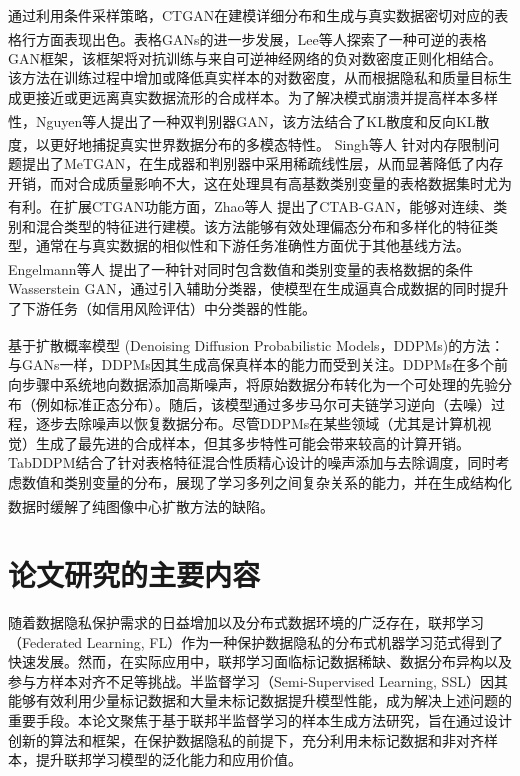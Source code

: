 通过利用条件采样策略，CTGAN在建模详细分布和生成与真实数据密切对应的表格行方面表现出色。表格GANs的进一步发展，Lee等人\textsuperscript{\cite{lee2021invertible}}探索了一种可逆的表格GAN框架，该框架将对抗训练与来自可逆神经网络的负对数密度正则化相结合。该方法在训练过程中增加或降低真实样本的对数密度，从而根据隐私和质量目标生成更接近或更远离真实数据流形的合成样本。为了解决模式崩溃并提高样本多样性，Nguyen等人\textsuperscript{\cite{nguyen2017dual}}提出了一种双判别器GAN，该方法结合了KL散度和反向KL散度，以更好地捕捉真实世界数据分布的多模态特性。 Singh等人\textsuperscript{\cite{singh2021metgan}} 针对内存限制问题提出了MeTGAN，在生成器和判别器中采用稀疏线性层，从而显著降低了内存开销，而对合成质量影响不大，这在处理具有高基数类别变量的表格数据集时尤为有利。在扩展CTGAN功能方面，Zhao等人\textsuperscript{\cite{zhao2021ctab}} 提出了CTAB-GAN，能够对连续、类别和混合类型的特征进行建模。该方法能够有效处理偏态分布和多样化的特征类型，通常在与真实数据的相似性和下游任务准确性方面优于其他基线方法。 Engelmann等人\textsuperscript{\cite{engelmann2021conditional}} 提出了一种针对同时包含数值和类别变量的表格数据的条件Wasserstein GAN，通过引入辅助分类器，使模型在生成逼真合成数据的同时提升了下游任务（如信用风险评估）中分类器的性能。

基于扩散概率模型 (Denoising Diffusion Probabilistic Models，DDPMs)\textsuperscript{\cite{ho2020denoising}}的方法：与GANs一样，DDPMs因其生成高保真样本的能力而受到关注。DDPMs在多个前向步骤中系统地向数据添加高斯噪声，将原始数据分布转化为一个可处理的先验分布（例如标准正态分布）。随后，该模型通过多步马尔可夫链学习逆向（去噪）过程，逐步去除噪声以恢复数据分布。尽管DDPMs在某些领域（尤其是计算机视觉）生成了最先进的合成样本，但其多步特性可能会带来较高的计算开销。TabDDPM结合了针对表格特征混合性质精心设计的噪声添加与去除调度，同时考虑数值和类别变量的分布，展现了学习多列之间复杂关系的能力，并在生成结构化数据时缓解了纯图像中心扩散方法的缺陷\textsuperscript{\cite{kotelnikov2023tabddpm}}。

\section{论文研究的主要内容}
随着数据隐私保护需求的日益增加以及分布式数据环境的广泛存在，联邦学习（Federated Learning, FL）作为一种保护数据隐私的分布式机器学习范式得到了快速发展。然而，在实际应用中，联邦学习面临标记数据稀缺、数据分布异构以及参与方样本对齐不足等挑战。半监督学习（Semi-Supervised Learning, SSL）因其能够有效利用少量标记数据和大量未标记数据提升模型性能，成为解决上述问题的重要手段。本论文聚焦于基于联邦半监督学习的样本生成方法研究，旨在通过设计创新的算法和框架，在保护数据隐私的前提下，充分利用未标记数据和非对齐样本，提升联邦学习模型的泛化能力和应用价值。

